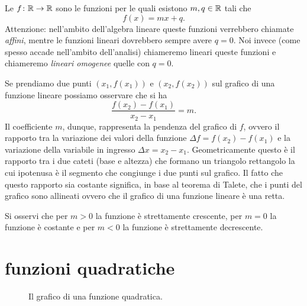 Le 
$f\colon \mathbb R \to \mathbb R$ sono le funzioni per le quali
esistono $m,q\in\mathbb R$ tali che
\[
  f(x) = mx + q.
\]
Attenzione: nell'ambito dell'algebra lineare queste
funzioni verrebbero chiamate \emph{affini}, mentre
le funzioni lineari dovrebbero sempre avere $q=0$.
Noi invece (come spesso accade nell'ambito dell'analisi)
chiameremo lineari queste funzioni e chiameremo
\emph{lineari omogenee} quelle con $q=0$.

Se prendiamo due punti $(x_1,f(x_1))$
e $(x_2,f(x_2))$ sul grafico di una funzione lineare
possiamo osservare che si ha
\[
  \frac{f(x_2) - f(x_1)}{x_2 - x_1} = m.
\]
Il coefficiente $m$, dunque, rappresenta la pendenza del
grafico di $f$, ovvero il rapporto tra la variazione
dei valori della funzione $\Delta f = f(x_2) - f(x_1)$
e la variazione della variabile in ingresso
$\Delta x = x_2 - x_1$.
Geometricamente questo è il rapporto tra i due cateti
(base e altezza) che formano un triangolo rettangolo la
cui ipotenusa è il segmento che congiunge i due punti sul grafico.
Il fatto che questo rapporto sia costante significa,
in base al teorema di Talete, che i punti del grafico sono
allineati ovvero che il grafico di una funzione lineare è una retta.

Si osservi che per $m>0$ la funzione è strettamente crescente,
per $m=0$ la funzione è costante e per $m<0$ la funzione è
strettamente decrescente.

\section{funzioni quadratiche}

\begin{figure}
  \begin{center}
  \end{center}
  \caption{Il grafico di una funzione quadratica.}
  \label{fig:funzione_quadratica}
\end{figure}

